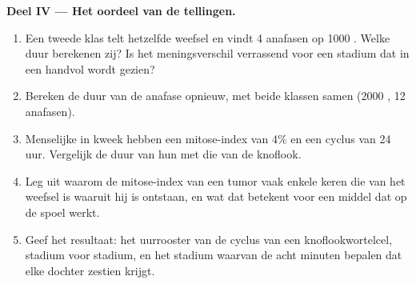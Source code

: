 \begin{problem}
\medskip
\noindent\textbf{Deel IV --- Het oordeel van de tellingen.}
\begin{enumerate}[resume]
  \item Een tweede klas telt hetzelfde weefsel en vindt 4 anafasen op
        1000 . Welke duur berekenen zij? Is het meningsverschil
        verrassend voor een stadium dat in een handvol  wordt
        gezien?
  \item Bereken de duur van de anafase opnieuw, met beide klassen samen
        (2000 , 12 anafasen).
  \item Menselijke  in kweek hebben een mitose-index van 4\% en een
        cyclus van 24 uur. Vergelijk de duur van hun  met die van
        de knoflook.
  \item Leg uit waarom de mitose-index van een tumor vaak enkele keren
        die van het weefsel is waaruit hij is ontstaan, en wat dat
        betekent voor een middel dat op de spoel werkt.
  \item Geef het resultaat: het uurrooster van de cyclus van een
        knoflookwortelcel, stadium voor stadium, en het stadium waarvan
        de acht minuten bepalen dat elke dochter zestien 
        krijgt.
\end{enumerate}
\end{problem}
